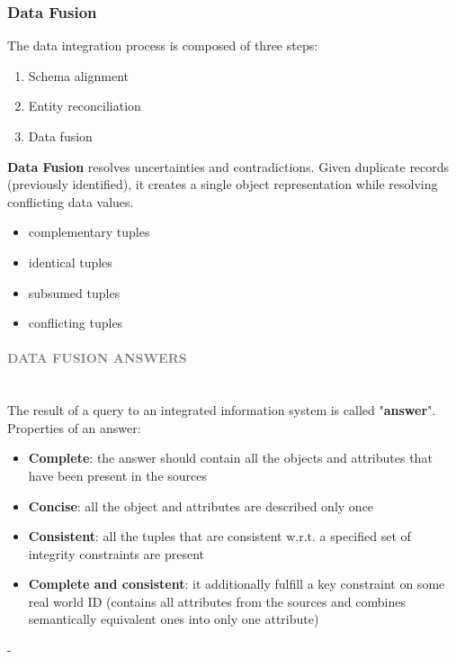 \documentclass[10pt,a4paper]{article}
\newcommand{\myparagraph}[1]{\paragraph{\normalsize{\textcolor{gray}{\uppercase{\textbf{#1}}}} }\mbox{} \vspace{0.5em}\\}
\begin{document}
\subsubsection{Data Fusion}
The data integration process is composed of three steps:
\begin{enumerate}
	\item Schema alignment
	\item Entity reconciliation
	\item Data fusion
\end{enumerate}
\textbf{Data Fusion} resolves uncertainties and contradictions. Given duplicate records (previously identified), it creates a single object representation while resolving conflicting data values.
\begin{itemize}
	\item complementary tuples
	\item identical tuples
	\item subsumed tuples
	\item conflicting tuples
\end{itemize}
\myparagraph{Data Fusion ANSWERS}
The result of a query to an integrated information system is called "\textbf{answer}". \\ 
Properties of an answer:
\begin{itemize}
	\item \textbf{Complete}: the answer should contain all the objects and attributes that have been present in the sources
	\item \textbf{Concise}: all the object and attributes are described only once
	\item \textbf{Consistent}: all the tuples that are consistent w.r.t. a specified set of integrity constraints are present
	\item \textbf{Complete and consistent}: it additionally fulfill a key constraint on some real world ID (contains all attributes from the sources and combines semantically equivalent ones into only one attribute)
\end{itemize}
- 
\end{document}
